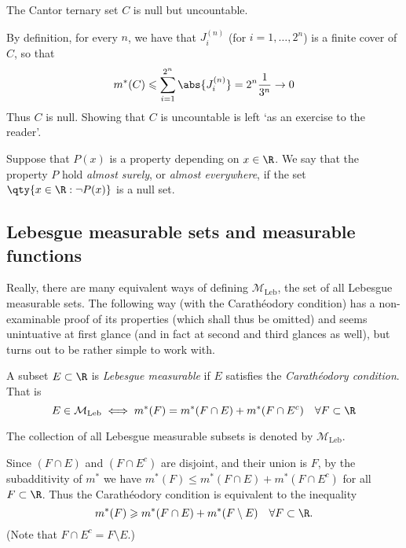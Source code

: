 \documentclass{maths}
\newcommand{\mleb}{\mathcal{M}_{\text{Leb}}}
\begin{document}
\begin{prop}
    The Cantor ternary set $C$ is null but uncountable.
\end{prop}

\begin{prf}
    By definition, for every $n$, we have that $J_i^(n)$ (for $i = 1,\ldots,2^n$) is a finite cover of $C$, so that
    \[
        m^*(C) \leqslant
        \sum_{i=1}^{2^n} \abs{J_i^{(n)}} =
        2^n \frac{1}{3^n} \to
        0
    \]
    Thus $C$ is null.
    Showing that $C$ is uncountable is left `as an exercise to the reader'.
\end{prf}

\begin{defn}
    Suppose that $P(x)$ is a property depending on $x\in\R$.
    We say that the property $P$ hold \emph{almost surely}, or \emph{almost everywhere}, if the set $\qty{x\in\R : \neg P(x)}$ is a null set.
\end{defn}

\subsection{Lebesgue measurable sets and measurable functions}

Really, there are many equivalent ways of defining $\mleb$, the set of all Lebesgue measurable sets.
The following way (with the Carath\'eodory condition) has a non-examinable proof of its properties (which shall thus be omitted) and seems unintuative at first glance (and in fact at second and third glances as well), but turns out to be rather simple to work with.

\begin{defn}
    A subset $E\subset\R$ is \emph{Lebesgue measurable} if $E$ satisfies the \emph{Carath\'eodory condition}.
    That is
    \[
        E\in\mleb \iff
        m^*(F) =
        m^*(F\cap E) + m^*(F\cap E^c)\quad\forall F\subset\R
    \]

    The collection of all Lebesgue measurable subsets is denoted by $\mleb$.
\end{defn}

\begin{rem}
    Since $(F\cap E)$ and $(F\cap E^c)$ are disjoint, and their union is $F$, by the subadditivity of $m^*$ we have $m^*(F)\leqslant m^*(F\cap E) + m^*(F\cap E^c)$ for all $F\subset\R$.
    Thus the Carath\'eodory condition is equivalent to the inequality
    \[
        m^*(F) \geqslant
        m^*(F\cap E) + m^*(F\setminus E)\quad\forall F\subset\R.
    \]
    (Note that $F\cap E^c = F\setminus E$.)
\end{rem}
\end{document}
